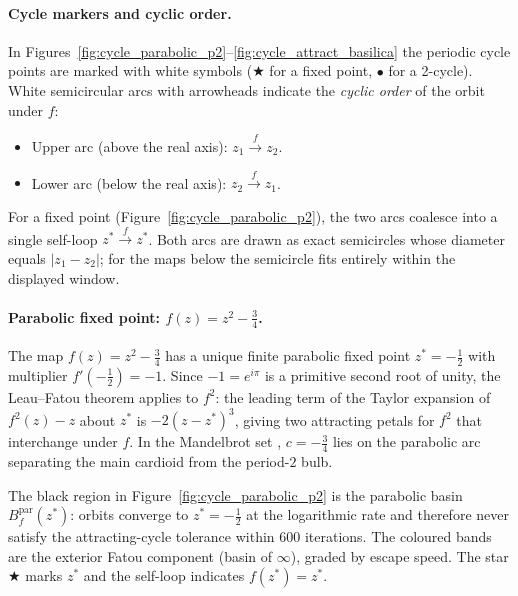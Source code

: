 \documentclass[12pt]{article}
\theoremstyle{definition}
\begin{document}
\paragraph{Cycle markers and cyclic order.}
In Figures~\ref{fig:cycle_parabolic_p2}--\ref{fig:cycle_attract_basilica}
the periodic cycle points are marked with white symbols
($\bigstar$ for a fixed point, $\bullet$ for a 2-cycle).
White semicircular arcs with arrowheads indicate the \emph{cyclic order}
of the orbit under $f$:
\begin{itemize}
  \item Upper arc (above the real axis): $z_1 \xrightarrow{\;f\;} z_2$.
  \item Lower arc (below the real axis): $z_2 \xrightarrow{\;f\;} z_1$.
\end{itemize}
For a fixed point (Figure~\ref{fig:cycle_parabolic_p2}), the two arcs
coalesce into a single self-loop $z^* \xrightarrow{f} z^*$.
Both arcs are drawn as exact semicircles whose diameter equals
$|z_1 - z_2|$; for the maps below the semicircle fits entirely within
the displayed window.

\paragraph{Parabolic fixed point: $f(z)=z^2-\tfrac{3}{4}$.}

The map $f(z)=z^2-\tfrac{3}{4}$ has a unique finite parabolic fixed
point $z^*=-\tfrac{1}{2}$ with multiplier $f'(-\tfrac{1}{2})=-1$.
Since $-1=e^{i\pi}$ is a primitive second root of unity, the
Leau--Fatou theorem applies to $f^2$: the leading term of the Taylor
expansion of $f^2(z)-z$ about $z^*$ is $-2(z-z^*)^3$, giving two
attracting petals for $f^2$ that interchange under $f$.  In the
Mandelbrot set \cite{DouadyHubbard1985}, $c=-\tfrac{3}{4}$ lies on the parabolic arc separating
the main cardioid from the period-$2$ bulb.

The black region in Figure~\ref{fig:cycle_parabolic_p2} is the
parabolic basin $B^{\mathrm{par}}_f(z^*)$: orbits converge to
$z^*=-\tfrac{1}{2}$ at the logarithmic rate and therefore never satisfy
the attracting-cycle tolerance within $600$ iterations.  The coloured
bands are the exterior Fatou component (basin of $\infty$), graded by
escape speed.  The star $\bigstar$ marks $z^*$ and the self-loop
indicates $f(z^*)=z^*$.
\end{document}
